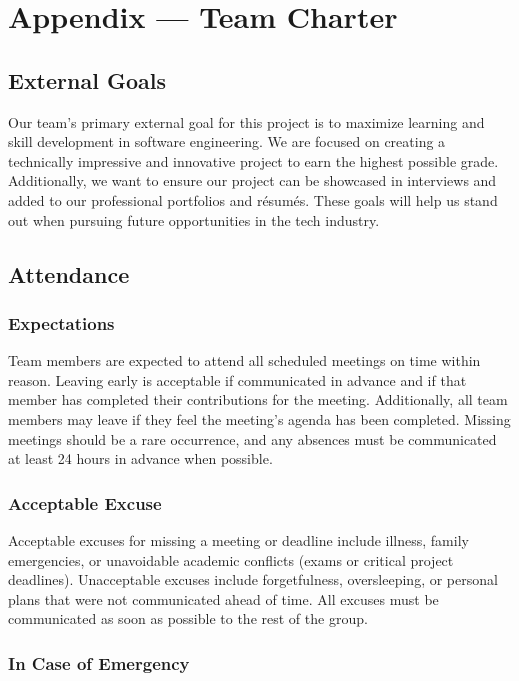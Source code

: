 \documentclass{article}
\begin{document}
\newpage{}

\section*{Appendix --- Team Charter}

\subsection*{External Goals}

Our team’s primary external goal for this project is to maximize learning and skill development in software engineering. We are focused on creating a technically impressive and innovative project 
to earn the highest possible grade. Additionally, we want to ensure our project can be showcased in interviews and added to our professional portfolios and résumés. These goals will help us stand 
out when pursuing future opportunities in the tech industry.

\subsection*{Attendance}

\subsubsection*{Expectations}

Team members are expected to attend all scheduled meetings on time within reason. Leaving early is acceptable if communicated in advance and if that member has completed their contributions for 
the meeting. Additionally, all team members may leave if they feel the meeting’s agenda has been completed. Missing meetings should be a rare occurrence, and any absences must be communicated at 
least 24 hours in advance when possible.


\subsubsection*{Acceptable Excuse}

Acceptable excuses for missing a meeting or deadline include illness, family emergencies, or unavoidable academic conflicts (exams or critical project deadlines). Unacceptable excuses include 
forgetfulness, oversleeping, or personal plans that were not communicated ahead of time. All excuses must be communicated as soon as possible to the rest of the group.

\subsubsection*{In Case of Emergency}
\end{document}
